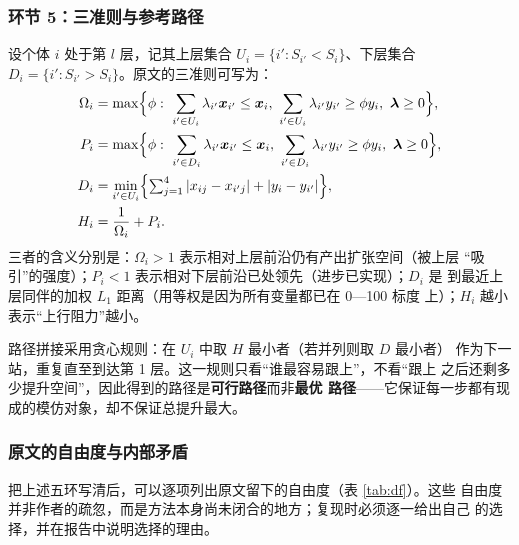 \subsubsection{环节 5：三准则与参考路径}

设个体 $i$ 处于第 $l$ 层，记其上层集合 $U_i=\{i':S_{i'}<S_i\}$、下层集合
$D_i=\{i':S_{i'}>S_i\}$。原文的三准则可写为：
\begin{align}
\Omega_i&=\max\Bigl\{\phi:\ \sum_{i'\in U_i}\lambda_{i'}\bm{x}_{i'}\le\bm{x}_i,\
\sum_{i'\in U_i}\lambda_{i'}y_{i'}\ge\phi y_i,\ \bm{\lambda}\ge0\Bigr\},
\label{eq:omega}\\
P_i&=\max\Bigl\{\phi:\ \sum_{i'\in D_i}\lambda_{i'}\bm{x}_{i'}\le\bm{x}_i,\
\sum_{i'\in D_i}\lambda_{i'}y_{i'}\ge\phi y_i,\ \bm{\lambda}\ge0\Bigr\},
\label{eq:progress}\\
D_i&=\min_{i'\in U_i}\Bigl\{\textstyle\sum_{j=1}^{4}|x_{ij}-x_{i'j}|+|y_i-y_{i'}|\Bigr\},
\label{eq:prox}\\
H_i&=\frac{1}{\Omega_i}+P_i .
\label{eq:H}
\end{align}
三者的含义分别是：$\Omega_i>1$ 表示相对上层前沿仍有产出扩张空间（被上层
“吸引”的强度）；$P_i<1$ 表示相对下层前沿已处领先（进步已实现）；$D_i$ 是
到最近上层同伴的加权 $L_1$ 距离（用等权是因为所有变量都已在 0—100 标度
上）；$H_i$ 越小表示“上行阻力”越小。

路径拼接采用贪心规则：在 $U_i$ 中取 $H$ 最小者（若并列则取 $D$ 最小者）
作为下一站，重复直至到达第 1 层。这一规则只看“谁最容易跟上”，不看“跟上
之后还剩多少提升空间”，因此得到的路径是\textbf{可行路径}而非\textbf{最优
路径}——它保证每一步都有现成的模仿对象，却不保证总提升最大。

\subsubsection{原文的自由度与内部矛盾}

把上述五环写清后，可以逐项列出原文留下的自由度（表 \ref{tab:df}）。这些
自由度并非作者的疏忽，而是方法本身尚未闭合的地方；复现时必须逐一给出自己
的选择，并在报告中说明选择的理由。

